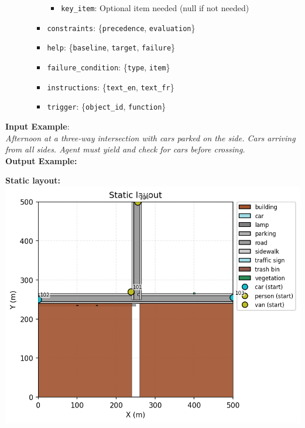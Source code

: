 \documentclass{article}
\begin{document}
\begin{tcolorbox}[examplebox, title=Scene Specification Format]
\begin{itemize}
\begin{itemize}
\begin{itemize}
\begin{itemize}
                \item \texttt{key\_item}: Optional item needed (null if not needed)
            \end{itemize}
            \item \texttt{constraints}: \{\texttt{precedence}, \texttt{evaluation}\}
            \item \texttt{help}: \{\texttt{baseline}, \texttt{target}, \texttt{failure}\}
            \item \texttt{failure\_condition}: \{\texttt{type}, \texttt{item}\}
            \item \texttt{instructions}: \{\texttt{text\_en}, \texttt{text\_fr}\}
            \item \texttt{trigger}: \{\texttt{object\_id}, \texttt{function}\}
        \end{itemize}
    \end{itemize}
\end{itemize}
\vspace{1em}

\textbf{Input Example}: \\

\emph{Afternoon at a three-way intersection with cars parked on the side. Cars arriving from all sides. Agent must yield and check for cars before crossing.}\\


\noindent\textbf{Output Example:}

\textbf{Static layout:}\\
\includegraphics[width=0.8\linewidth]{images/gemini_static.png}

\label{fig:gemini_static_example}

\vspace{1em}


\end{tcolorbox}
\end{document}
